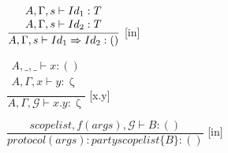 \hspace*{10em}
$ \dfrac{
\begin{array}{l}
    A, \Gamma, s \vdash{} Id_1 : T\\
    A, \Gamma, s \vdash{} Id_2 : T\\
\end{array}
}{A, \Gamma, s \vdash{} Id_1 \Rightarrow Id_2 : ()}$ [in]\bigskip

\hspace*{10em}
$ \dfrac{
\begin{array}{l}
    A,\_,\_ \vdash x:()\\
    A,\Gamma,x \vdash y : \upzeta\\
\end{array}
}{A, \Gamma, \mathscr{G} \vdash x.y : \upzeta}$ [x.y]\bigskip

\hspace*{10em}
$ \dfrac{scopelist, f(args), \mathscr{G} \vdash B : ()}{protocol(args): party scopelist \{B\} : ()}$ [in]\bigskip
